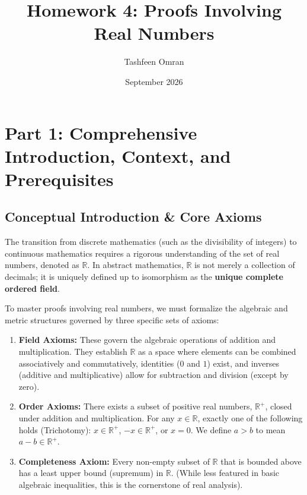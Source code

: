 \documentclass[11pt]{article}
\title{\textbf{Homework 4: Proofs Involving Real Numbers}}
\author{Tashfeen Omran}
\date{September 2026}
\theoremstyle{definition}
\theoremstyle{remark}
\begin{document}
\maketitle
\tableofcontents
\newpage

\section{Part 1: Comprehensive Introduction, Context, and Prerequisites}

\subsection{Conceptual Introduction \& Core Axioms}
The transition from discrete mathematics (such as the divisibility of integers) to continuous mathematics requires a rigorous understanding of the set of real numbers, denoted as $\mathbb{R}$. In abstract mathematics, $\mathbb{R}$ is not merely a collection of decimals; it is uniquely defined up to isomorphism as the \textbf{unique complete ordered field}. 

To master proofs involving real numbers, we must formalize the algebraic and metric structures governed by three specific sets of axioms:
\begin{enumerate}
    \item \textbf{Field Axioms:} These govern the algebraic operations of addition and multiplication. They establish $\mathbb{R}$ as a space where elements can be combined associatively and commutatively, identities ($0$ and $1$) exist, and inverses (additive and multiplicative) allow for subtraction and division (except by zero).
    \item \textbf{Order Axioms:} There exists a subset of positive real numbers, $\mathbb{R}^{+}$, closed under addition and multiplication. For any $x \in \mathbb{R}$, exactly one of the following holds (Trichotomy): $x \in \mathbb{R}^{+}$, $-x \in \mathbb{R}^{+}$, or $x = 0$. We define $a > b$ to mean $a - b \in \mathbb{R}^{+}$.
    \item \textbf{Completeness Axiom:} Every non-empty subset of $\mathbb{R}$ that is bounded above has a least upper bound (supremum) in $\mathbb{R}$. (While less featured in basic algebraic inequalities, this is the cornerstone of real analysis).
\end{enumerate}
\end{document}
